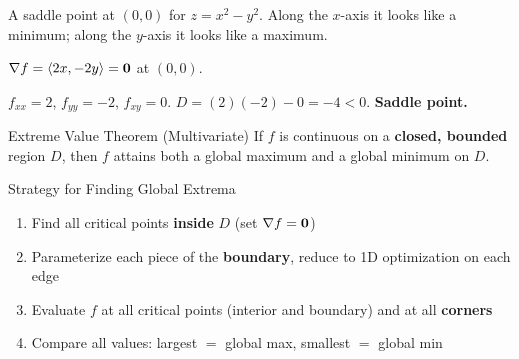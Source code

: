 \documentclass[11pt]{article}
\begin{document}
\begin{center}

{\small A saddle point at $(0,0)$ for $z=x^2-y^2$. Along the $x$-axis it looks like a minimum; along the $y$-axis it looks like a maximum.}
\end{center}

\begin{example}[The Classic Saddle: $z = x^2 - y^2$]
$\nabla f = \left\langle 2x, -2y \right\rangle = \mathbf{0}$ at $(0,0)$.

$f_{xx} = 2$, \; $f_{yy} = -2$, \; $f_{xy} = 0$. \; $D = (2)(-2) - 0 = -4 < 0$. \textbf{Saddle point.}

\end{example}


\begin{thmbox}{Extreme Value Theorem (Multivariate)}
If $f$ is continuous on a \textbf{closed, bounded} region $D$, then $f$ attains both a global maximum and a global minimum on $D$.
\end{thmbox}

\begin{formulabox}{Strategy for Finding Global Extrema}
\begin{enumerate}[nosep]
  \item Find all critical points \textbf{inside} $D$ (set $\nabla f = \mathbf{0}$)
  \item Parameterize each piece of the \textbf{boundary}, reduce to 1D optimization on each edge
  \item Evaluate $f$ at all critical points (interior and boundary) and at all \textbf{corners}
  \item Compare all values: largest $=$ global max, smallest $=$ global min
\end{enumerate}
\end{formulabox}
\end{document}
